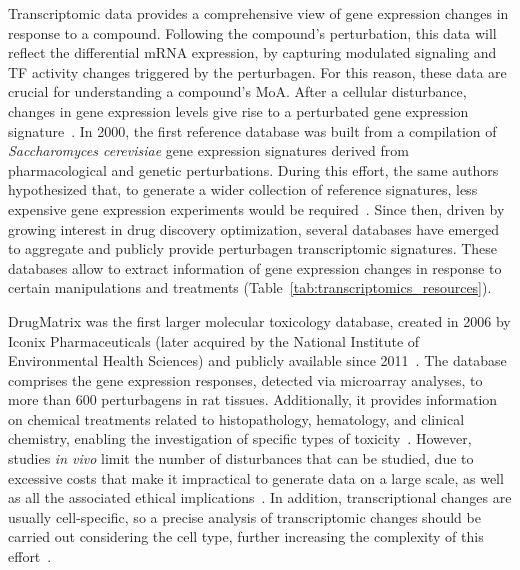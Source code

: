 Transcriptomic data provides a comprehensive view of gene expression changes in response to a compound. 
Following the compound's perturbation, this data will reflect the differential mRNA expression, by capturing modulated signaling and \gls{TF} activity changes triggered by the perturbagen. 
For this reason, these data are crucial for understanding a compound's \gls{MoA}. 
After a cellular disturbance, changes in gene expression levels give rise to a perturbated gene expression signature~\cite{RN114}. 
In 2000, the first reference database was built from a compilation of \textit{Saccharomyces cerevisiae} gene expression signatures derived from pharmacological and genetic perturbations. 
During this effort, the same authors hypothesized that, to generate a wider collection of reference signatures, less expensive gene expression experiments would be required~\cite{RN115, RN116, RN117}. 
Since then, driven by growing interest in drug discovery optimization, several databases have emerged to aggregate and publicly provide perturbagen transcriptomic signatures. 
These databases allow to extract information of gene expression changes in response to certain manipulations and treatments (Table~\ref{tab:transcriptomics_resources}).


DrugMatrix was the first larger molecular toxicology database, created in 2006 by Iconix Pharmaceuticals (later acquired by the National Institute of Environmental Health Sciences) and publicly available since 2011~\cite{RN115, RN118, RN119}. 
The database comprises the gene expression responses, detected via microarray analyses, to more than 600 perturbagens in rat tissues. 
Additionally, it provides information on chemical treatments related to histopathology, hematology, and clinical chemistry, enabling the investigation of specific types of toxicity~\cite{RN121}. 
However, studies \textit{in vivo} limit the number of disturbances that can be studied, due to excessive costs that make it impractical to generate data on a large scale, as well as all the associated ethical implications~\cite{RN34}. 
In addition, transcriptional changes are usually cell-specific, so a precise analysis of transcriptomic changes should be carried out considering the cell type, further increasing the complexity of this effort~\cite{RN86}.


